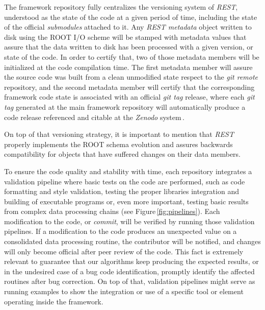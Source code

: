 The framework repository fully centralizes the versioning system of \emph{REST}, understood as the state of the code at a given period of time, including the state of the official \emph{submodules} attached to it. Any \emph{REST metadata} object written to disk using the ROOT I/O scheme will be stamped with metadata values that assure that the data written to disk has been processed with a given version, or state of the code. In order to certify that, two of those metadata members will be initialized at the code compilation time. The first metadata member will assure the source code was built from a clean unmodified state respect to the \emph{git remote} repository, and the second metadata member will certify that the corresponding framework code state is associated with an official \emph{git tag} release, where each \emph{git tag} generated at the main framework repository will automatically produce a code release referenced and citable at the \emph{Zenodo} system\,\cite{javier_galan_2021_4692983}.

On top of that versioning strategy, it is important to mention that \emph{REST} properly implements the ROOT schema evolution and assures backwards compatibility for objects that have suffered changes on their data members.




To ensure the code quality and stability with time, each repository integrates a validation pipeline where basic tests on the code are performed, such as code formatting and style validation, testing the proper libraries integration and building of executable programs or, even more important, testing basic results from complex data processing chains (see Figure\,\ref{fig:pipelines}). Each modification to the code, or \emph{commit}, will be verified by running those validation pipelines. If a modification to the code produces an unexpected value on a consolidated data processing routine, the contributor will be notified, and changes will only become official after peer review of the code. This fact is extremely relevant to guarantee that our algorithms keep producing the expected results, or in the undesired case of a bug code identification, promptly identify the affected routines after bug correction. On top of that, validation pipelines might serve as running examples to show the integration or use of a specific tool or element operating inside the framework.


